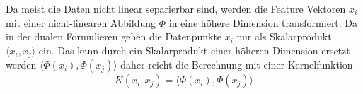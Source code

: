 Da meist die Daten nicht linear separierbar sind, werden die Feature Vektoren
$x_i$ mit einer nicht-linearen Abbildung $\Phi$ in eine höhere Dimension transformiert.
Da in der dualen Formulieren gehen die Datenpunkte $x_i$ nur als Skalarprodukt
$\langle x_i,x_j \rangle$ ein. Das kann durch ein Skalarprodukt einer höheren
Dimension ersetzt werden $\langle \Phi(x_i),\Phi(x_j) \rangle$ daher reicht die Berechnung mit einer Kernelfunktion
\begin{displaymath}
    K(x_i,x_j) = \langle \Phi(x_i),\Phi(x_j) \rangle
\end{displaymath}
